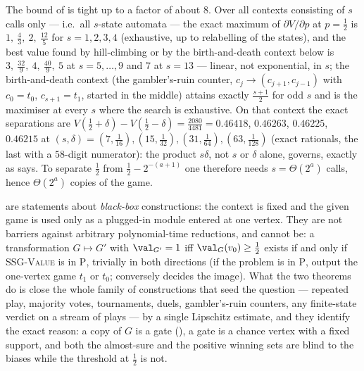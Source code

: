 \begin{remark}\label{rem:fs16-measured}
The bound of  is tight up to a factor of about $8$. Over all
contexts consisting of $s$ calls only --- i.e.\ all $s$-state automata --- the
exact maximum of $\partial V/\partial p$ at $p=\tfrac12$ is
$1,\ \tfrac43,\ 2,\ \tfrac{12}5$ for $s=1,2,3,4$ (exhaustive, up to relabelling
of the states), and the best value found by hill-climbing or by the
birth-and-death context below is $3,\ \tfrac{32}9,\ 4,\ \tfrac{40}9,\ 5$ at
$s=5,\dots,9$ and $7$ at $s=13$ --- linear, not exponential, in $s$; the
birth-and-death context (the gambler's-ruin counter,
$c_j\to(c_{j+1},c_{j-1})$ with $c_0=t_0$, $c_{s+1}=t_1$, started in the middle)
attains exactly $\tfrac{s+1}2$ for odd $s$ and is the maximiser at every $s$
where the search is exhaustive. On that context the exact separations are
$V(\tfrac12+\delta)-V(\tfrac12-\delta)=
\tfrac{2080}{4481}=0.46418$, $0.46263$, $0.46225$, $0.46215$ at
$(s,\delta)=(7,\tfrac1{16}),(15,\tfrac1{32}),(31,\tfrac1{64}),(63,\tfrac1{128})$
(exact rationals, the last with a $58$-digit numerator): the product $s\delta$,
not $s$ or $\delta$ alone, governs, exactly as  says. To
separate $\tfrac12$ from $\tfrac12-2^{-(a+1)}$ one therefore needs
$s=\Theta(2^{a})$ calls, hence $\Theta(2^{a})$ copies of the game.
\end{remark}

\begin{remark}\label{rem:fs16-scope}
 are statements about \emph{black-box}
constructions: the context is fixed and the given game is used only as a
plugged-in module entered at one vertex. They are not barriers against
arbitrary polynomial-time reductions, and cannot be: a transformation
$G\mapsto G'$ with $\val_{G'}=1$ iff $\val_G(v_0)\ge\tfrac12$ exists if and
only if \textsc{SSG-Value} is in $\mathrm{P}$, trivially in both directions
(if the problem is in $\mathrm{P}$, output the one-vertex game $t_1$ or $t_0$;
conversely  decides the image). What the two theorems do
is close the whole family of constructions that seed the question --- repeated
play, majority votes, tournaments, duels, gambler's-ruin counters, any
finite-state verdict on a stream of plays --- by a single Lipschitz estimate,
and they identify the exact reason: a copy of $G$ is a gate
(), a gate is a chance vertex with a fixed support, and both
the almost-sure and the positive winning sets are blind to the biases while the
threshold at $\tfrac12$ is not.
\end{remark}

